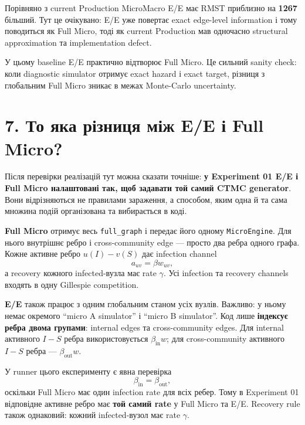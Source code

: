 \documentclass[11pt,a4paper]{article}
\begin{document}
Порівняно з current Production MicroMacro E/E має RMST приблизно на \textbf{1267} більший. Тут це очікувано: E/E уже повертає exact edge-level information і тому поводиться як Full Micro, тоді як current Production мав одночасно structural approximation та implementation defect.

\begin{tcolorbox}[colback=soft,colframe=exact,title=Головний результат E/E]
У цьому baseline E/E практично відтворює Full Micro. Це сильний sanity check: коли diagnostic simulator отримує exact hazard і exact target, різниця з глобальним Full Micro зникає в межах Monte-Carlo uncertainty.
\end{tcolorbox}

\section*{7. То яка різниця між E/E і Full Micro?}

Після перевірки реалізацій тут можна сказати точніше: \textbf{у Experiment 01 E/E і Full Micro налаштовані так, щоб задавати той самий CTMC generator}. Вони відрізняються не правилами зараження, а способом, яким одна й та сама множина подій організована та вибирається в коді.

\textbf{Full Micro} отримує весь \texttt{full\_graph} і передає його одному \texttt{MicroEngine}. Для нього внутрішнє ребро і cross-community edge --- просто два ребра одного графа. Кожне активне ребро $u(I)-v(S)$ дає infection channel
\[
 a_{uv}=\beta w_{uv},
\]
а recovery кожного infected-вузла має rate $\gamma$. Усі infection та recovery channels входять в одну Gillespie competition.

\textbf{E/E} також працює з одним глобальним станом усіх вузлів. Важливо: у ньому немає окремого ``micro A simulator'' і ``micro B simulator''. Код лише \textbf{індексує ребра двома групами}: internal edges та cross-community edges. Для internal активного $I-S$ ребра використовується $\beta_{\mathrm{in}}w$; для cross-community активного $I-S$ ребра --- $\beta_{\mathrm{out}}w$.

У runner цього експерименту є явна перевірка
\[
\beta_{\mathrm{in}}=\beta_{\mathrm{out}},
\]
оскільки Full Micro має один infection rate для всіх ребер. Тому в Experiment 01 відповідне активне ребро має \textbf{той самий rate} у Full Micro та E/E. Recovery rule також однаковий: кожний infected-вузол має rate $\gamma$.
\end{document}
